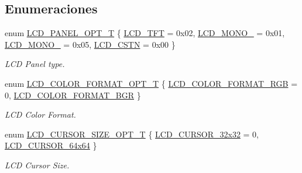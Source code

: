 \subsection*{Enumeraciones}
\begin{DoxyCompactItemize}
\item 
enum \hyperlink{group___l_c_d__18_x_x__43_x_x_gaceee4b8b7afdc1a97b365dc2feb4ecca}{L\+C\+D\+\_\+\+P\+A\+N\+E\+L\+\_\+\+O\+P\+T\+\_\+T} \{ \hyperlink{group___l_c_d__18_x_x__43_x_x_ggaceee4b8b7afdc1a97b365dc2feb4eccaa00e3399b074ff76827ba4bb796daf3b6}{L\+C\+D\+\_\+\+T\+FT} = 0x02, 
\hyperlink{group___l_c_d__18_x_x__43_x_x_ggaceee4b8b7afdc1a97b365dc2feb4eccaad2639cf608d91ec46b6cf2ce7a490494}{L\+C\+D\+\_\+\+M\+O\+N\+O\+\_} = 0x01, 
\hyperlink{group___l_c_d__18_x_x__43_x_x_ggaceee4b8b7afdc1a97b365dc2feb4eccaa92d1598a61d705cd7e2b2f0829977d33}{L\+C\+D\+\_\+\+M\+O\+N\+O\+\_} = 0x05, 
\hyperlink{group___l_c_d__18_x_x__43_x_x_ggaceee4b8b7afdc1a97b365dc2feb4eccaa015be97b134328f3b44403b8c28fa85e}{L\+C\+D\+\_\+\+C\+S\+TN} = 0x00
 \}\begin{DoxyCompactList}\small\item\em L\+CD Panel type. \end{DoxyCompactList}
\item 
enum \hyperlink{group___l_c_d__18_x_x__43_x_x_gac365c31cd880844cf31747394cd0f93a}{L\+C\+D\+\_\+\+C\+O\+L\+O\+R\+\_\+\+F\+O\+R\+M\+A\+T\+\_\+\+O\+P\+T\+\_\+T} \{ \hyperlink{group___l_c_d__18_x_x__43_x_x_ggac365c31cd880844cf31747394cd0f93aaaece371e0b75415f8d1827920f5c5a9e}{L\+C\+D\+\_\+\+C\+O\+L\+O\+R\+\_\+\+F\+O\+R\+M\+A\+T\+\_\+\+R\+GB} = 0, 
\hyperlink{group___l_c_d__18_x_x__43_x_x_ggac365c31cd880844cf31747394cd0f93aad4dec73fcfd38460506c7c9d244f2149}{L\+C\+D\+\_\+\+C\+O\+L\+O\+R\+\_\+\+F\+O\+R\+M\+A\+T\+\_\+\+B\+GR}
 \}\begin{DoxyCompactList}\small\item\em L\+CD Color Format. \end{DoxyCompactList}
\item 
enum \hyperlink{group___l_c_d__18_x_x__43_x_x_gacd66e01df306369e87e482a36a2cc66b}{L\+C\+D\+\_\+\+C\+U\+R\+S\+O\+R\+\_\+\+S\+I\+Z\+E\+\_\+\+O\+P\+T\+\_\+T} \{ \hyperlink{group___l_c_d__18_x_x__43_x_x_ggacd66e01df306369e87e482a36a2cc66ba5d1d44bda3d01e8e1c9a001bc1b56a28}{L\+C\+D\+\_\+\+C\+U\+R\+S\+O\+R\+\_\+32x32} = 0, 
\hyperlink{group___l_c_d__18_x_x__43_x_x_ggacd66e01df306369e87e482a36a2cc66ba68245535ad3b833e1cef4bee16deb95f}{L\+C\+D\+\_\+\+C\+U\+R\+S\+O\+R\+\_\+64x64}
 \}\begin{DoxyCompactList}\small\item\em L\+CD Cursor Size. \end{DoxyCompactList}
\end{DoxyCompactItemize}
